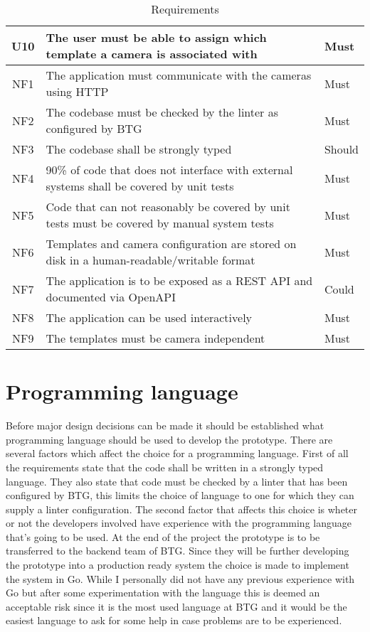 \begin{table*}[h]
\begin{tabulary}{\linewidth}{CLL}
		\\ \hline
		U10 & The user must be able to assign which template a camera is associated with & Must
        \\ \hline
        NF1 & The application must communicate with the cameras using HTTP & Must
        \\ \hline
        NF2 & The codebase must be checked by the linter as configured by BTG & Must
        \\ \hline
        NF3 & The codebase shall be strongly typed & Should
        \\ \hline
        NF4 & 90\% of code that does not interface with external systems shall be covered by unit tests& Must
		\\ \hline
		NF5 & Code that can not reasonably be covered by unit tests must be covered by manual system tests & Must
        \\ \hline
        NF6 & Templates and camera configuration are stored on disk in a human-readable/writable format & Must
        \\ \hline
        NF7 & The application is to be exposed as a REST API and documented via OpenAPI & Could
		\\ \hline
		NF8 & The application can be used interactively & Must
        \\ \hline
        NF9 & The templates must be camera independent & Must
    \end{tabulary}
    \caption{Requirements}
    \label{tab:requirements}
\end{table*}

\section{Programming language}
Before major design decisions can be made it should be established what programming language should be used to develop the prototype.
There are several factors which affect the choice for a programming language.
First of all the requirements state that the code shall be written in a strongly typed language.
They also state that code must be checked by a linter that has been configured by BTG, this limits the choice of language to one for which they can supply a linter configuration.
The second factor that affects this choice is wheter or not the developers involved have experience with the programming language that's going to be used.
At the end of the project the prototype is to be transferred to the backend team of BTG.
Since they will be further developing the prototype into a production ready system the choice is made to implement the system in Go.
While I personally did not have any previous experience with Go but after some experimentation with the language this is deemed an acceptable risk since it is the most used language at BTG and it would be the easiest language to ask for some help in case problems are to be experienced.

